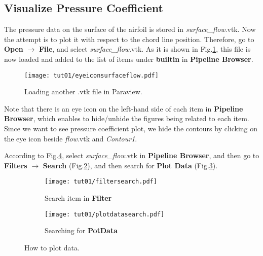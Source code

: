 \subsection{Visualize Pressure Coefficient}
The pressure data on the surface of the airfoil is stored in \textit{surface\_flow}.vtk. Now the attempt is to plot it with respect to the chord line position. Therefore, go to \textbf{Open} $\rightarrow$ \textbf{File}, and select \textit{surface\_flow}.vtk. As it is shown in Fig.\ref{fig:builtin}, this file is now loaded and added to the list of items under \textbf{builtin} in \textbf{Pipeline Browser}.
\begin{figure}[htbp]
    \centering
    \texttt{[image: tut01/eyeiconsurfaceflow.pdf]}
    \caption{Loading another .vtk file in Paraview.}
    \label{fig:builtin}
\end{figure}
Note that there is an eye icon on the left-hand side of each item in \textbf{Pipeline Browser}, which enables to hide/unhide the figures being related to each item. Since we want to see pressure coefficient plot, we hide the contours by clicking on the eye icon beside \textit{flow}.vtk and \textit{Contour1}. 

According to Fig.\ref{fig:plotdata}, select \textit{surface\_flow}.vtk in \textbf{Pipeline Browser}, and then go to \textbf{Filters} $\rightarrow$ \textbf{Search} (Fig.\ref{fig:plotdata a}), and then search for \textbf{Plot Data} (Fig.\ref{fig:plotdata b}). 
\begin{figure}[htbp]
    \centering
     \begin{subfigure}[b]{.4\textwidth}
         \centering
         \texttt{[image: tut01/filtersearch.pdf]}
         \caption{Search item in \textbf{Filter}}
         \label{fig:plotdata a}
     \end{subfigure}
     \hfill
     \begin{subfigure}[b]{.4\textwidth}
         \centering
         \texttt{[image: tut01/plotdatasearch.pdf]}
         \caption{Searching for \textbf{PotData}}
         \label{fig:plotdata b}
     \end{subfigure}     
    \caption{How to plot data.}
    \label{fig:plotdata}
\end{figure}

